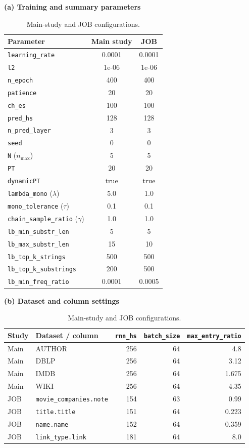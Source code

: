 \begin{table}[H]
\centering
\small
\setlength{\tabcolsep}{5pt}
\caption{Main-study and JOB configurations.}
\label{tab:A_configuration}
\textbf{(a) Training and summary parameters}\\[3pt]
\begin{tabular*}{\textwidth}{@{\extracolsep{\fill}}lcc@{}}
\toprule
Parameter & Main study & JOB \\
\midrule
\texttt{learning\_rate} & 0.0001 & 0.0001 \\
\texttt{l2} & 1e-06 & 1e-06 \\
\texttt{n\_epoch} & 400 & 400 \\
\texttt{patience} & 20 & 20 \\
\texttt{ch\_es} & 100 & 100 \\
\texttt{pred\_hs} & 128 & 128 \\
\texttt{n\_pred\_layer} & 3 & 3 \\
\texttt{seed} & 0 & 0 \\
\texttt{N} ($n_{\max}$) & 5 & 5 \\
\texttt{PT} & 20 & 20 \\
\texttt{dynamicPT} & true & true \\
\texttt{lambda\_mono} ($\lambda$) & 5.0 & 1.0 \\
\texttt{mono\_tolerance} ($\tau$) & 0.1 & 0.1 \\
\texttt{chain\_sample\_ratio} ($\gamma$) & 1.0 & 1.0 \\
\texttt{lb\_min\_substr\_len} & 5 & 5 \\
\texttt{lb\_max\_substr\_len} & 15 & 10 \\
\texttt{lb\_top\_k\_strings} & 500 & 500 \\
\texttt{lb\_top\_k\_substrings} & 200 & 500 \\
\texttt{lb\_min\_freq\_ratio} & 0.0001 & 0.0005 \\
\bottomrule
\end{tabular*}
\par\medskip
\textbf{(b) Dataset and column settings}\\[3pt]
\begin{tabular*}{\textwidth}{@{\extracolsep{\fill}}llrrr@{}}
\toprule
Study & Dataset / column & \texttt{rnn\_hs} & \texttt{batch\_size} & \texttt{max\_entry\_ratio} \\
\midrule
Main & AUTHOR & 256 & 64 & 4.8 \\
Main & DBLP & 256 & 64 & 3.12 \\
Main & IMDB & 256 & 64 & 1.675 \\
Main & WIKI & 256 & 64 & 4.35 \\
\midrule
JOB & \texttt{movie\_companies.note} & 154 & 63 & 0.99 \\
JOB & \texttt{title.title} & 151 & 64 & 0.223 \\
JOB & \texttt{name.name} & 152 & 64 & 0.359 \\
JOB & \texttt{link\_type.link} & 181 & 64 & 8.0 \\
\bottomrule
\end{tabular*}
\end{table}
